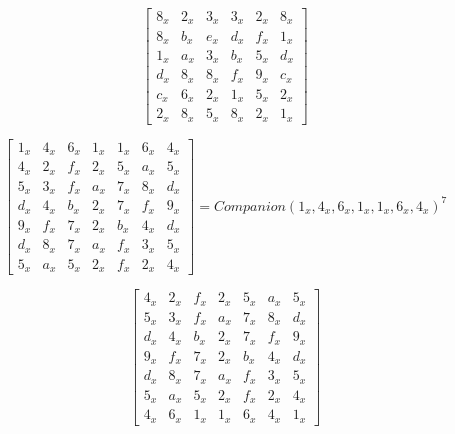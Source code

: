 \begin{equation}\label{mat:photon_a144-inv}
  \begin{bmatrix}
  8_x & 2_x & 3_x & 3_x & 2_x & 8_x\\
  8_x & b_x & e_x & d_x & f_x & 1_x\\
  1_x & a_x & 3_x & b_x & 5_x & d_x\\
  d_x & 8_x & 8_x & f_x & 9_x & c_x\\
  c_x & 6_x & 2_x & 1_x & 5_x & 2_x\\
  2_x & 8_x & 5_x & 8_x & 2_x & 1_x
  \end{bmatrix}
\end{equation}

\begin{equation}\label{mat:photon_a196}
  \begin{bmatrix}
  1_x & 4_x & 6_x & 1_x & 1_x & 6_x & 4_x\\
  4_x & 2_x & f_x & 2_x & 5_x & a_x & 5_x\\
  5_x & 3_x & f_x & a_x & 7_x & 8_x & d_x\\
  d_x & 4_x & b_x & 2_x & 7_x & f_x & 9_x\\
  9_x & f_x & 7_x & 2_x & b_x & 4_x & d_x\\
  d_x & 8_x & 7_x & a_x & f_x & 3_x & 5_x\\
  5_x & a_x & 5_x & 2_x & f_x & 2_x & 4_x
  \end{bmatrix}
  =
  Companion(1_x,4_x,6_x,1_x,1_x,6_x,4_x)^7
\end{equation}

\begin{equation}\label{mat:photon_a196-inv}
  \begin{bmatrix}
  4_x & 2_x & f_x & 2_x & 5_x & a_x & 5_x\\
  5_x & 3_x & f_x & a_x & 7_x & 8_x & d_x\\
  d_x & 4_x & b_x & 2_x & 7_x & f_x & 9_x\\
  9_x & f_x & 7_x & 2_x & b_x & 4_x & d_x\\
  d_x & 8_x & 7_x & a_x & f_x & 3_x & 5_x\\
  5_x & a_x & 5_x & 2_x & f_x & 2_x & 4_x\\
  4_x & 6_x & 1_x & 1_x & 6_x & 4_x & 1_x
  \end{bmatrix}
\end{equation}

